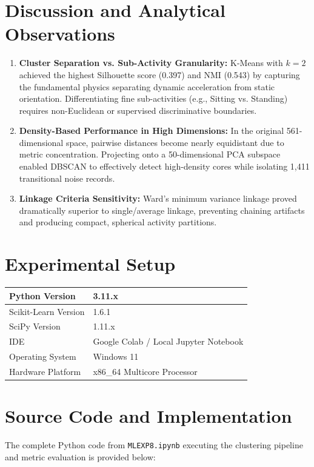 \documentclass[12pt,a4paper]{article}
\begin{document}
\section{Discussion and Analytical Observations}
\begin{enumerate}[leftmargin=*]
    \item \textbf{Cluster Separation vs. Sub-Activity Granularity:} K-Means with $k=2$ achieved the highest Silhouette score (0.397) and NMI (0.543) by capturing the fundamental physics separating dynamic acceleration from static orientation. Differentiating fine sub-activities (e.g., Sitting vs. Standing) requires non-Euclidean or supervised discriminative boundaries.
    \item \textbf{Density-Based Performance in High Dimensions:} In the original 561-dimensional space, pairwise distances become nearly equidistant due to metric concentration. Projecting onto a 50-dimensional PCA subspace enabled DBSCAN to effectively detect high-density cores while isolating 1,411 transitional noise records.
    \item \textbf{Linkage Criteria Sensitivity:} Ward's minimum variance linkage proved dramatically superior to single/average linkage, preventing chaining artifacts and producing compact, spherical activity partitions.
\end{enumerate}

\section{Experimental Setup}
\begin{longtable}{|p{6cm}|p{8cm}|}
\hline
Python Version & 3.11.x\\ \hline
Scikit-Learn Version & 1.6.1\\ \hline
SciPy Version & 1.11.x\\ \hline
IDE & Google Colab / Local Jupyter Notebook\\ \hline
Operating System & Windows 11\\ \hline
Hardware Platform & x86\_64 Multicore Processor\\ \hline
\end{longtable}

\section{Source Code and Implementation}
The complete Python code from \texttt{MLEXP8.ipynb} executing the clustering pipeline and metric evaluation is provided below:
\end{document}
